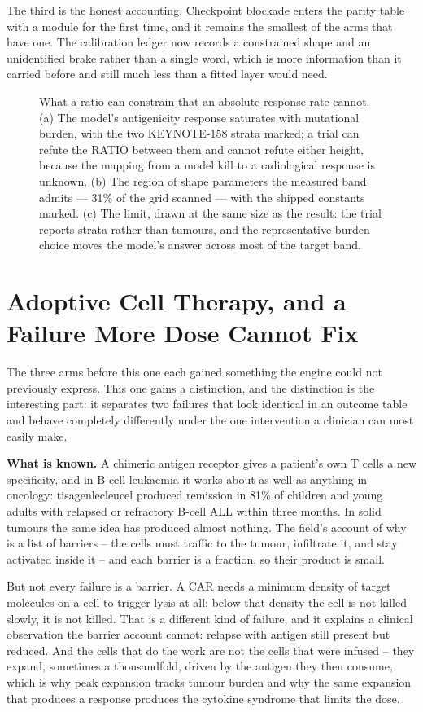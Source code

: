 \documentclass[11pt,twoside,openright]{report}
\begin{document}
The third is the honest accounting. Checkpoint blockade enters the parity table with a module for the first time, and it remains the smallest of the arms that have one. The calibration ledger now records a constrained shape and an unidentified brake rather than a single word, which is more information than it carried before and still much less than a fitted layer would need.

\begin{figure}[tbp]
\setcounter{figure}{33}
\caption{What a ratio can constrain that an absolute response rate cannot. (a) The model's antigenicity response saturates with mutational burden, with the two KEYNOTE-158 strata marked; a trial can refute the RATIO between them and cannot refute either height, because the mapping from a model kill to a radiological response is unknown. (b) The region of shape parameters the measured band admits --- 31\% of the grid scanned --- with the shipped constants marked. (c) The limit, drawn at the same size as the result: the trial reports strata rather than tumours, and the representative-burden choice moves the model's answer across most of the target band.}
\label{fig:fig38_checkpoint}
\end{figure}

\section{Adoptive Cell Therapy, and a Failure More Dose Cannot Fix}

The three arms before this one each gained something the engine could not previously express. This one gains a distinction, and the distinction is the interesting part: it separates two failures that look identical in an outcome table and behave completely differently under the one intervention a clinician can most easily make.

\textbf{What is known.} A chimeric antigen receptor gives a patient's own T cells a new specificity, and in B-cell leukaemia it works about as well as anything in oncology: tisagenlecleucel produced remission in 81\% of children and young adults with relapsed or refractory B-cell ALL within three months. In solid tumours the same idea has produced almost nothing. The field's account of why is a list of barriers -- the cells must traffic to the tumour, infiltrate it, and stay activated inside it -- and each barrier is a fraction, so their product is small.

But not every failure is a barrier. A CAR needs a minimum density of target molecules on a cell to trigger lysis at all; below that density the cell is not killed slowly, it is not killed. That is a different kind of failure, and it explains a clinical observation the barrier account cannot: relapse with antigen still present but reduced. And the cells that do the work are not the cells that were infused -- they expand, sometimes a thousandfold, driven by the antigen they then consume, which is why peak expansion tracks tumour burden and why the same expansion that produces a response produces the cytokine syndrome that limits the dose.
\end{document}
